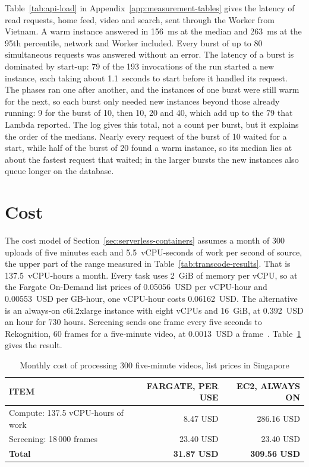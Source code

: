Table~\ref{tab:api-load} in Appendix~\ref{app:measurement-tables} gives the latency of read requests, home feed, video and search, sent
through the Worker from Vietnam. A warm instance answered in 156~ms at the median and 263~ms at the
95th percentile, network and Worker included. Every burst of up to 80 simultaneous requests was
answered without an error. The latency of a burst is dominated by start-up: 79 of the 193
invocations of the run started a new instance, each taking about 1.1~seconds to start before it
handled its request. The phases ran one after another, and the instances of one burst were still
warm for the next, so each burst only needed new instances beyond those already running: 9 for the
burst of 10, then 10, 20 and 40, which add up to the 79 that Lambda reported. The log gives this
total, not a count per burst, but it explains the order of the medians. Nearly every request of the
burst of 10 waited for a start, while half of the burst of 20 found a warm instance, so its median
lies at about the fastest request that waited; in the larger bursts the new instances also queue
longer on the database.

\section{Cost}
\label{sec:cost-analysis}

The cost model of Section~\ref{sec:serverless-containers} assumes a month of 300 uploads of five
minutes each and 5.5~vCPU-seconds of work per second of source, the upper part of the range measured
in Table~\ref{tab:transcode-results}. That is 137.5~vCPU-hours a month. Every task uses 2~GiB of memory
per vCPU, so at the Fargate On-Demand list prices of 0.05056~USD per vCPU-hour and 0.00553~USD per
GB-hour, one vCPU-hour costs 0.06162~USD. The alternative is an always-on c6i.2xlarge instance with
eight vCPUs and 16~GiB, at 0.392~USD an hour for 730 hours. Screening sends one frame every five
seconds to Rekognition, 60 frames for a five-minute video, at 0.0013~USD a frame~\cite{awsrekognitionpricing}.
Table~\ref{tab:cost-comparison} gives the result.

\begin{table}[H]
\centering
\caption{Monthly cost of processing 300 five-minute videos, list prices in Singapore}
\label{tab:cost-comparison}
\small
\begin{tabularx}{\textwidth}{>{\raggedright\arraybackslash}X r r}
\toprule
\textbf{ITEM} & \textbf{FARGATE, PER USE} & \textbf{EC2, ALWAYS ON} \\
\midrule
Compute: 137.5 vCPU-hours of work & 8.47 USD & 286.16 USD \\
Screening: 18\,000 frames & 23.40 USD & 23.40 USD \\
\midrule
\textbf{Total} & \textbf{31.87 USD} & \textbf{309.56 USD} \\
\bottomrule
\end{tabularx}
\end{table}

